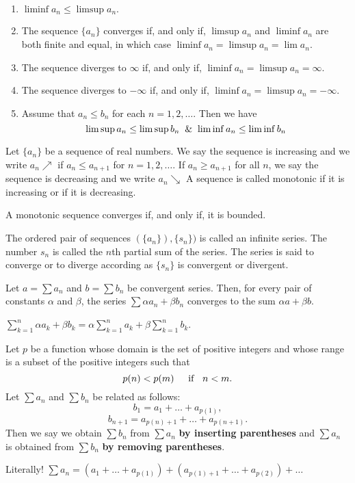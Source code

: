 \documentclass[10pt,a4paper]{book}
\begin{document}
\begin{Thm}
\begin{enumerate}
    \item $\liminf a_n \leq \limsup a_n.$
    \item The sequence $\{a_n\}$ converges if, and only if, $\limsup a_n$ and $\liminf a_n$ are both finite and equal, in which case $\liminf a_n = \limsup a_n = \lim a_n$.
    \item The sequence diverges to $\infty$ if, and only if, $\liminf a_n = \limsup a_n = \infty.$
    \item The sequence diverges to $-\infty$ if, and only if, $\liminf a_n = \limsup a_n = -\infty.$
    \item  Assume that $a_n \leq b_n$ for each $n = 1, 2, \dots$. Then we have
    $$\limsup{ a_n } \leq \limsup{ b_n } \And \liminf{ a_n } \leq \liminf{ b_n }$$
    

\end{enumerate}

\end{Thm}
\newcommand{\se}{\searrow}
\newcommand{\ne}{\nearrow}
\begin{deff}
Let $\{a_n\}$ be a sequence of real numbers. We say the sequence is increasing and we write $a_n \ne$ if $a_n \leq a_{n+1}$ for $n = 1, 2, \dots.$ If $a_n \geq a_{n+1}$ for all $n$, we say the sequence is decreasing and we write $a_n \se$ A sequence is called monotonic if it is increasing or if it is decreasing.
\end{deff}
\begin{Thm}
 A monotonic sequence converges if, and only if, it is bounded.
\end{Thm}

\begin{deff}
The ordered pair of sequences $(\{a_n\}), \{s_n\})$ is called an infinite series. The number $s_n$ is called the $n$th partial sum of the series. The series is said to converge or to diverge according as $\{s_n\}$ is convergent or divergent.
\end{deff}
\begin{Thm}
Let $a = \sum a_n$ and $b = \sum b_n$ be convergent series. Then, for every
pair of constants $\alpha$ and $\beta$, the series $\sum \alpha a_n + \beta b_n$ converges to the sum $\alpha a + \beta b$.
\end{Thm}
\PP $\sum_{k =1}^n \alpha a_k + \beta b_k = \alpha \sum_{k =1}^n a_k +  \beta\sum_{k =1}^n b_k$.
\renewcommand{\if}{\hspace{0.4cm}\text{ if } \hspace{0.2cm}}
\begin{deff}
Let $p$ be a function whose domain is the set of positive integers and
whose range is a subset of the positive integers such that
$$p(n)  < p(m) \if n < m.$$
Let $\sum a_n$ and $\sum b_n$ be related as follows:
    $$b_1 = a_1 + \dots + a_{p(1)},$$
    $$b_{n+1}= a_{p(n)+1} + \dots + a_{p(n+1)}.$$
Then we say we obtain $\sum b_n$  from $\sum a_n $ \textbf{by inserting parentheses} and $\sum a_n$ is obtained from $\sum b_n$ \textbf{by removing parentheses}.
\end{deff}
\PP Literally! $\sum a_n = (a_1 + \dots + a_{p(1)}) + (a_{p(1)+1} + \dots + a_{p(2)}) + \dots$
\end{document}
